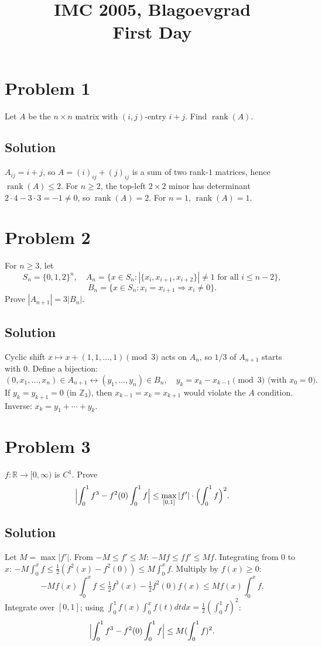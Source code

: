 \documentclass{article}
\title{IMC 2005, Blagoevgrad \\ First Day}
\date{}
\begin{document}
\maketitle

\section*{Problem 1}
Let $A$ be the $n \times n$ matrix with $(i, j)$-entry $i + j$. Find $\operatorname{rank}(A)$.

\subsection*{Solution}
$A_{ij} = i + j$, so $A = (i)_{ij} + (j)_{ij}$ is a sum of two rank-$1$ matrices, hence $\operatorname{rank}(A) \le 2$. For $n \ge 2$, the top-left $2 \times 2$ minor has determinant $2 \cdot 4 - 3 \cdot 3 = -1 \ne 0$, so $\operatorname{rank}(A) = 2$. For $n = 1$, $\operatorname{rank}(A) = 1$.

\section*{Problem 2}
For $n \ge 3$, let
\[
S_n = \{0, 1, 2\}^n, \quad A_n = \{x \in S_n : |\{x_i, x_{i+1}, x_{i+2}\}| \ne 1 \text{ for all } i \le n-2\},
\]
\[
B_n = \{x \in S_n : x_i = x_{i+1} \Rightarrow x_i \ne 0\}.
\]
Prove $|A_{n+1}| = 3 |B_n|$.

\subsection*{Solution}
Cyclic shift $x \mapsto x + (1, 1, \ldots, 1) \pmod 3$ acts on $A_n$, so $1/3$ of $A_{n+1}$ starts with $0$. Define a bijection:
\[
(0, x_1, \ldots, x_n) \in A_{n+1} \longleftrightarrow (y_1, \ldots, y_n) \in B_n, \quad y_k = x_k - x_{k-1} \pmod 3 \text{ (with } x_0 = 0\text{)}.
\]
If $y_k = y_{k+1} = 0$ (in $\mathbb{Z}_3$), then $x_{k-1} = x_k = x_{k+1}$ would violate the $A$ condition. Inverse: $x_k = y_1 + \cdots + y_k$.

\section*{Problem 3}
$f : \mathbb{R} \to [0, \infty)$ is $C^1$. Prove
\[
\Bigl| \int_0^1 f^3 - f^2(0) \int_0^1 f \Bigr| \le \max_{[0,1]} |f'| \cdot \Bigl(\int_0^1 f\Bigr)^2.
\]

\subsection*{Solution}
Let $M = \max|f'|$. From $-M \le f' \le M$: $-M f \le f f' \le M f$. Integrating from $0$ to $x$: $-M \int_0^x f \le \tfrac{1}{2}(f^2(x) - f^2(0)) \le M \int_0^x f$. Multiply by $f(x) \ge 0$:
\[
-M f(x) \int_0^x f \le \tfrac{1}{2} f^3(x) - \tfrac{1}{2} f^2(0) f(x) \le M f(x) \int_0^x f.
\]
Integrate over $[0, 1]$; using $\int_0^1 f(x) \int_0^x f(t) dt dx = \tfrac{1}{2}(\int_0^1 f)^2$:
\[
\Bigl|\int_0^1 f^3 - f^2(0) \int_0^1 f\Bigr| \le M (\int_0^1 f)^2.
\]
\end{document}
